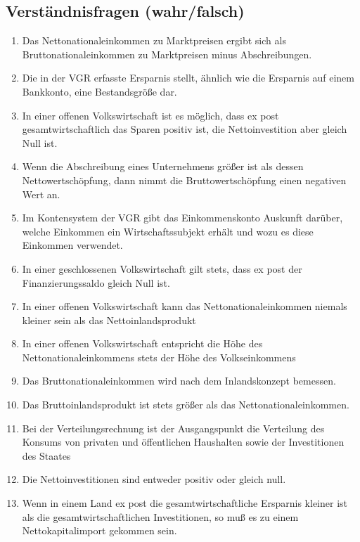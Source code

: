 \documentclass{scrartcl}
\begin{document}
\subsection{Verst\"{a}ndnisfragen (wahr/falsch)}
\begin{enumerate}
  \item Das Nettonationaleinkommen zu Marktpreisen ergibt sich als Bruttonationaleinkommen zu Marktpreisen minus Abschreibungen.%
  \item Die in der VGR erfasste Ersparnis stellt, \"{a}hnlich wie die Ersparnis auf einem Bankkonto, eine Bestandsgr\"{o}{\ss}e dar.%
  \item In einer offenen Volkswirtschaft ist es m\"{o}glich, dass ex post gesamtwirtschaftlich das Sparen positiv ist, die Nettoinvestition aber gleich Null ist.%
  \item Wenn die Abschreibung eines Unternehmens gr\"{o}{\ss}er ist als dessen Nettowertsch\"{o}pfung, dann nimmt die Bruttowertsch\"{o}pfung einen negativen Wert an.%
  \item Im Kontensystem der VGR gibt das Einkommenskonto Auskunft dar\"{u}ber, welche Einkommen ein Wirtschaftssubjekt erh\"{a}lt und wozu es diese Einkommen verwendet.%
  \item In einer geschlossenen Volkswirtschaft gilt stets, dass ex post der Finanzierungssaldo gleich Null ist. %
  \item In einer offenen Volkswirtschaft kann das Nettonationaleinkommen niemals kleiner sein als das Nettoinlandsprodukt%
  \item In einer offenen Volkswirtschaft entspricht die H\"{o}he des Nettonationaleinkommens stets der H\"{o}he des Volkseinkommens%
  \item Das Bruttonationaleinkommen wird nach dem Inlandskonzept bemessen. %
    \item Das Bruttoinlandsprodukt ist stets gr\"{o}{\ss}er als das Nettonationaleinkommen. %
  \item Bei der Verteilungsrechnung ist der Ausgangspunkt die Verteilung des Konsums von privaten und \"{o}ffentlichen Haushalten sowie der Investitionen des Staates%
    \item Die Nettoinvestitionen sind entweder positiv oder gleich null. %
  \item Wenn in einem Land ex post die gesamtwirtschaftliche Ersparnis kleiner ist als die gesamtwirtschaftlichen Investitionen, so mu{\ss} es zu einem Nettokapitalimport gekommen sein. %

\end{enumerate}
\end{document}
